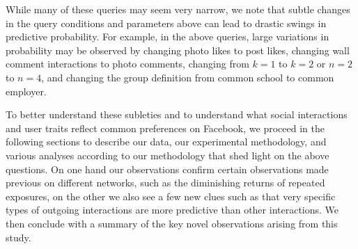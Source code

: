While many of these queries may seem very narrow, we note that subtle
changes in the query conditions and parameters above can lead to
drastic swings in predictive probability.  For example, in the above
queries, large variations in probability may be 
observed by changing photo likes to post likes, changing
wall comment interactions to photo comments, changing from $k=1$ to
$k=2$ or $n=2$ to $n=4$, and changing the group definition from common
school to common employer.

To better understand these subleties and to understand what
social interactions and user traits reflect common preferences on
Facebook, we proceed in the following sections to describe our data,
our experimental methodology, and various analyses according to our
methodology that shed light on the above questions. 
On one hand our observations confirm certain observations made previous 
on different networks, such as the diminishing returns of repeated exposures, 
on the other we also see a few new clues such as 
that very specific types of outgoing interactions are more predictive 
than other interactions. 
We then conclude with a summary of the key novel observations arising
from this study.

